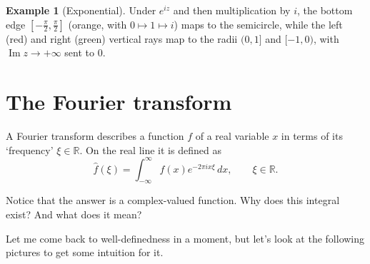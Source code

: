 \documentclass[11pt]{article}
\theoremstyle{plain}
\theoremstyle{definition}
\newtheorem{example}[theorem]{Example}
\theoremstyle{boldremark}
\theoremstyle{remark}
\numberwithin{equation}{section}
\newcommand{\R}{\mathbb{R}}
\DeclareMathOperator{\Imag}{Im}
\newenvironment{lecturefigure}
 {\par\addvspace{0.25em}\begingroup\setlength{\parskip}{0pt}\centering}
 {\par\endgroup\addvspace{0.25em}}
\begin{document}
\begin{example}[Exponential]
\begin{lecturefigure}
\begin{minipage}{\linewidth}

\vspace{0.15em}
{\small Under $e^{iz}$ and then multiplication by $i$, the bottom edge
$[-\frac{\pi}{2},\frac{\pi}{2}]$ (orange, with $0\mapsto 1\mapsto i$) maps
to the semicircle, while the left (red) and right (green) vertical rays map
to the radii $(0,1]$ and $[-1,0)$, with $\Imag z\to+\infty$ sent to $0$.}
\end{minipage}
\end{lecturefigure}
\end{example}

\section{The Fourier transform}

A Fourier transform describes a function $f$ of a real variable $x$ in terms of its `frequency'
 $\xi \in \R$. On the real line it is defined as
\[
 \widehat f(\xi)=\int_{-\infty}^{\infty} f(x)e^{-2\pi i x\xi}\,dx,
 \qquad \xi\in\R.
\]

Notice that the answer is a complex-valued function. Why does this integral exist? And what does it mean?

Let me come back to well-definedness in a moment, but let's look at the following pictures to get some intuition for it.
\end{document}
